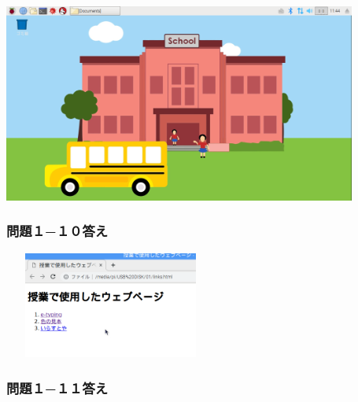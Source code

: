 \documentclass[a4paper,12pt]{jarticle}
\begin{document}
\centering
\includegraphics[width=11.621cm,height=6.533cm]{textbook-img223.png}


\flushleft
\fi
\clearpage
\begin{minipage}{\textwidth}
\subsubsection{\bfseries
問題１−１０答え}

\centering
\includegraphics[width=7.0cm,height=3.5cm]{textbook-img224.png}
\flushleft

\subsubsection{\bfseries
問題１−１１答え}


\end{minipage}
\end{document}
